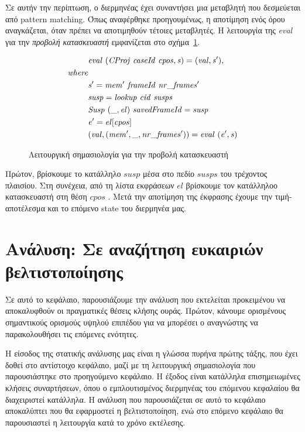 \documentclass[diploma]{softlab-thesis}
\begin{document}
Σε αυτήν την περίπτωση, ο διερμηνέας έχει συναντήσει μια μεταβλητή που δεσμεύεται από
pattern matching. Όπως αναφέρθηκε προηγουμένως, η αποτίμηση 
ενός όρου αναγκάζεται, όταν πρέπει να αποτιμηθούν τέτοιες μεταβλητές.
Η λειτουργία της \textit{eval} για την \textit{προβολή κατασκευαστή} εμφανίζεται στο
σχήμα~\ref{fig:consproj-el}.

\begin{figure}[htp]
  \begin{align*}
    & \mathit{eval \hfill\ (CProj \hfill\ caseId \hfill\ cpos, s) = (val, s'),} \\
    \mathit{where } \\
    & \mathit{s' = mem' \hfill\ frameId \hfill\ nr\_frames'} \\
    & \mathit{susp = lookup \hfill\ cid \hfill\ susps} \\
    & \mathit{Susp \hfill\ (\_, el) \hfill\ savedFrameId = susp} \\
    & \mathit{e' = el[cpos]} \\
    & \mathit{(val, (mem', \_, nr\_frames')) = eval \hfill\ (e', s)}
  \end{align*}
\caption{Λειτουργική σημασιολογία για την προβολή κατασκευαστή\label{fig:consproj-el}}
\end{figure}

Πρώτον, βρίσκουμε το κατάλληλο $\mathit{susp}$ μέσα στο πεδίο $\mathit{susps}$ του τρέχοντος πλαισίου. Στη συνέχεια, 
από τη λίστα εκφράσεων $\mathit{el}$ βρίσκουμε τον κατάλληλοο κατασκευαστή στη θέση $\mathit{cpos}$ . 
Μετά την αποτίμηση της έκφρασης έχουμε την τιμή-αποτέλεσμα και το επόμενο state του διερμηνέα μας.

%

\chapter{Ανάλυση: Σε αναζήτηση ευκαιριών βελτιστοποίησης}
\label{ch:analysis-gr}

Σε αυτό το κεφάλαιο, παρουσιάζουμε την ανάλυση που εκτελείται προκειμένου να αποκαλυφθούν οι πραγματικές θέσεις κλήσης ουράς.
Πρώτον, κάνουμε ορισμένους σημαντικούς ορισμούς υψηλού επιπέδου για να μπορέσει ο αναγνώστης να παρακολουθήσει τις επόμενες ενότητες.

Η είσοδος της στατικής ανάλυσης μας είναι η γλώσσα πυρήνα πρώτης τάξης, που έχει δοθεί στο αντίστοιχο 
κεφάλαιο, μαζί με τη λειτουργική σημασιολογία που παρουσιάστηκε στο προηγούμενο κεφάλαιο.
Η έξοδος είναι κατάλληλα επισημειωμένες κλήσεις συναρτήσεων, όπου ο εμπλουτισμένος διερμηνέας του επόμενου κεφαλαίου θα διαχειριστεί κατάλληλα.
Η ανάλυση που παρουσιάζεται σε αυτό το κεφάλαιο αποκαλύπτει που θα εφαρμοστεί η βελτιστοποίηση, ενώ στο επόμενο κεφάλαιο θα παρουσιαστεί η λειτουργία 
κατά το χρόνο εκτέλεσης.
\end{document}

